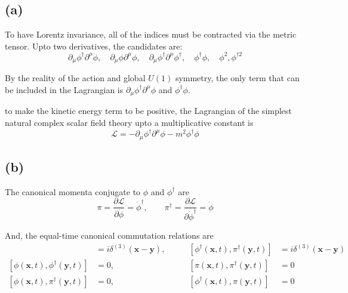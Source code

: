 \documentclass[a4paper,11pt]{article}
\begin{document}
\subsection{(a)}

To have Lorentz invariance, all of the indices must be contracted via the metric tensor. Upto two derivatives, the candidates are:
\begin{equation}
    \partial_\mu\phi^\dagger\partial^\mu\phi,\quad \partial_\mu\phi\partial^\mu\phi, \quad \partial_\mu\phi^\dagger\partial^\mu\phi^\dagger, \quad\phi^\dagger\phi, \quad \phi^2, \phi^{\dagger 2}
\end{equation}

By the reality of the action and global $U(1)$ symmetry, the only term that can be included in the Lagrangian is $\partial_\mu\phi^\dagger\partial^\mu\phi$ and $\phi^\dagger\phi$. 

to make the kinetic energy term to be positive, the Lagrangian of the simplest natural complex scalar field theory upto a multiplicative constant is
\begin{equation}
    \mathcal{L} = -\partial_\mu\phi^\dagger\partial^\mu\phi - m^2\phi^\dagger\phi
\end{equation}

\subsection{(b)}

The canonical momenta conjugate to $\phi$ and $\phi^\dagger$ are
\begin{equation}
    \pi = \frac{\partial\mathcal{L}}{\partial\dot{\phi}} = \dot{\phi}^\dagger, \qquad \pi^\dagger = \frac{\partial\mathcal{L}}{\partial\dot{\phi}^\dagger} = \dot{\phi}
\end{equation}

And, the equal-time canonical commutation relations are
\begin{align}
    [\phi(\mathbf{x}, t), \pi(\mathbf{y}, t)] &= i\delta^{(3)}(\mathbf{x}-\mathbf{y}),& \qquad [\phi^\dagger(\mathbf{x}, t), \pi^\dagger(\mathbf{y}, t)] &= i\delta^{(3)}(\mathbf{x}-\mathbf{y})\\
    [\phi(\mathbf{x}, t), \phi^\dagger(\mathbf{y}, t)] &= 0,& \qquad [\pi(\mathbf{x}, t), \pi^\dagger(\mathbf{y}, t)] &= 0\\
    [\phi(\mathbf{x}, t), \pi^\dagger(\mathbf{y}, t)] &= 0,& \qquad [\phi^\dagger(\mathbf{x}, t), \pi(\mathbf{y}, t)] &= 0
\end{align}
\end{document}
